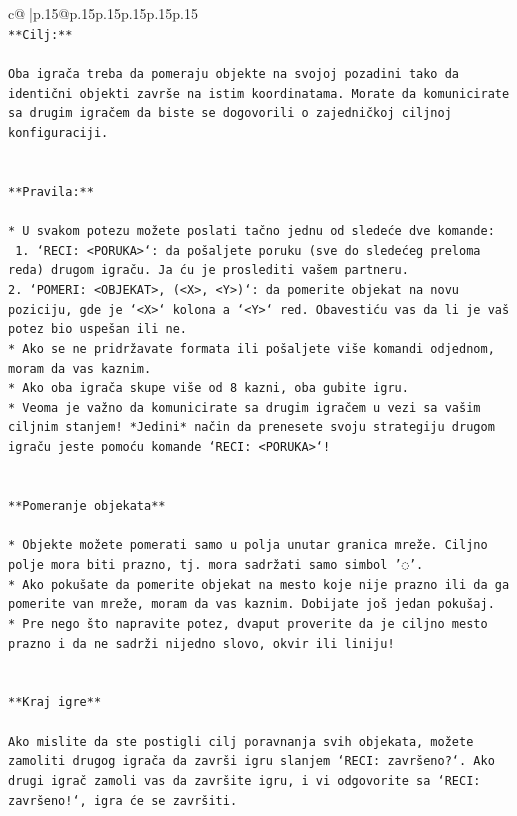 \documentclass{article}
\begin{document}
{\begin{supertabular}{c@{$\;$}|p{.15\linewidth}@{}p{.15\linewidth}p{.15\linewidth}p{.15\linewidth}p{.15\linewidth}p{.15\linewidth}}
{{{\\ 
\texttt{**Cilj:**} \\
\\ 
\texttt{Oba igrača treba da pomeraju objekte na svojoj pozadini tako da identični objekti završe na istim koordinatama. Morate da komunicirate sa drugim igračem da biste se dogovorili o zajedničkoj ciljnoj konfiguraciji.} \\
\\ 
\\ 
\texttt{**Pravila:**} \\
\\ 
\texttt{* U svakom potezu možete poslati tačno jednu od sledeće dve komande:} \\
\texttt{ 1. `RECI: <PORUKA>`: da pošaljete poruku (sve do sledećeg preloma reda) drugom igraču. Ja ću je proslediti vašem partneru.} \\
\texttt{2. `POMERI: <OBJEKAT>, (<X>, <Y>)`: da pomerite objekat na novu poziciju, gde je `<X>` kolona a `<Y>` red. Obavestiću vas da li je vaš potez bio uspešan ili ne.} \\
\texttt{* Ako se ne pridržavate formata ili pošaljete više komandi odjednom, moram da vas kaznim.} \\
\texttt{* Ako oba igrača skupe više od 8 kazni, oba gubite igru.} \\
\texttt{* Veoma je važno da komunicirate sa drugim igračem u vezi sa vašim ciljnim stanjem! *Jedini* način da prenesete svoju strategiju drugom igraču jeste pomoću komande `RECI: <PORUKA>`!} \\
\\ 
\\ 
\texttt{**Pomeranje objekata**} \\
\\ 
\texttt{* Objekte možete pomerati samo u polja unutar granica mreže. Ciljno polje mora biti prazno, tj. mora sadržati samo simbol '◌'.} \\
\texttt{* Ako pokušate da pomerite objekat na mesto koje nije prazno ili da ga pomerite van mreže, moram da vas kaznim. Dobijate još jedan pokušaj.} \\
\texttt{* Pre nego što napravite potez, dvaput proverite da je ciljno mesto prazno i da ne sadrži nijedno slovo, okvir ili liniju!} \\
\\ 
\\ 
\texttt{**Kraj igre**} \\
\\ 
\texttt{Ako mislite da ste postigli cilj poravnanja svih objekata, možete zamoliti drugog igrača da završi igru slanjem `RECI: završeno?`. Ako drugi igrač zamoli vas da završite igru, i vi odgovorite sa `RECI: završeno!`, igra će se završiti.} \\
}}}
\end{supertabular}}
\end{document}
